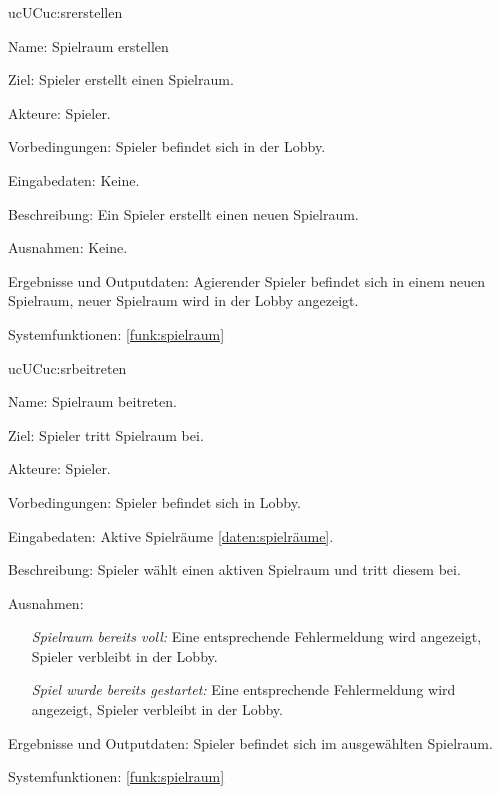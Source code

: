 \begin{description}[leftmargin=5em, style=sameline]

	\begin{lhp}{uc}{UC}{uc:srerstellen}
		\item [Name:]Spielraum erstellen
		\item [Ziel:]Spieler erstellt einen Spielraum.
		\item [Akteure:]Spieler. 
		\item [Vorbedingungen:]Spieler befindet sich in der Lobby.
		\item [Eingabedaten:]Keine.
		\item [Beschreibung:]Ein Spieler erstellt einen neuen Spielraum.
		\item [Ausnahmen:]Keine.
		\item [Ergebnisse und Outputdaten:] Agierender Spieler befindet sich in einem neuen Spielraum, neuer Spielraum wird in der Lobby angezeigt.
		\item [Systemfunktionen:] \ref{funk:spielraum} 
	\end{lhp}
	
	\begin{lhp}{uc}{UC}{uc:srbeitreten}
		\item [Name:]Spielraum beitreten.
		\item [Ziel:]Spieler tritt Spielraum bei.
		\item [Akteure:]Spieler.
		\item [Vorbedingungen:]Spieler befindet sich in Lobby.
		\item [Eingabedaten:] Aktive Spielräume \ref{daten:spielräume}.
		\item [Beschreibung:]Spieler wählt einen aktiven Spielraum und tritt diesem bei.
		\item [Ausnahmen:]\hfill \begin{itemize} 
		\item[] 
		\textit{Spielraum bereits voll:} Eine entsprechende Fehlermeldung wird angezeigt, Spieler verbleibt in der Lobby.
		\item[]
		\textit{Spiel wurde bereits gestartet:} Eine entsprechende Fehlermeldung wird angezeigt, Spieler verbleibt in der Lobby.
		\end{itemize}
		\item [Ergebnisse und Outputdaten:] Spieler befindet sich im ausgewählten Spielraum.
		\item [Systemfunktionen:] \ref{funk:spielraum} 
	\end{lhp}
	

\end{description}
